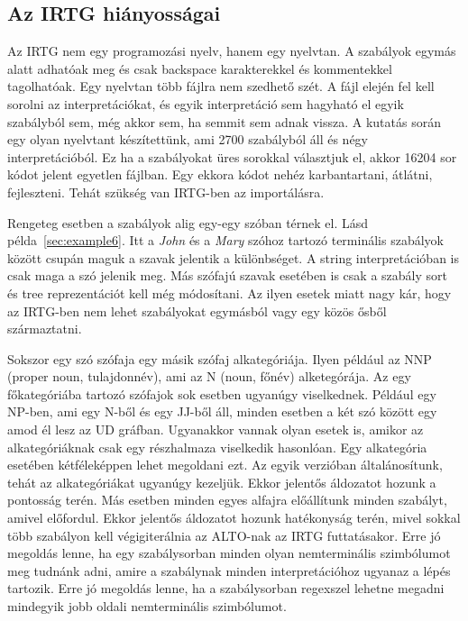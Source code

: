 \subsection{Az IRTG hiányosságai}
\label{sec:IRTGshortcomming}

Az IRTG nem egy programozási nyelv, hanem egy nyelvtan. A szabályok egymás alatt adhatóak meg és csak backspace karakterekkel és kommentekkel tagolhatóak. Egy nyelvtan több fájlra nem szedhető szét. A fájl elején fel kell sorolni az interpretációkat, és egyik interpretáció sem hagyható el egyik szabályból sem, még akkor sem, ha semmit sem adnak vissza. A kutatás során egy olyan nyelvtant készítettünk, ami 2700 szabályból áll és négy interpretációból. Ez ha a szabályokat üres sorokkal választjuk el, akkor 16204 sor kódot jelent egyetlen fájlban. Egy ekkora kódot nehéz karbantartani, átlátni, fejleszteni. Tehát szükség van IRTG-ben az importálásra.


Rengeteg esetben a szabályok alig egy-egy szóban térnek el. Lásd példa~\ref{sec:example6}.
Itt a \textit{John} és a \textit{Mary} szóhoz tartozó terminális szabályok között csupán maguk a szavak jelentik a különbséget. A string interpretációban is csak maga a szó jelenik meg. Más szófajú szavak esetében is csak a szabály sort és tree reprezentációt kell még módosítani. Az ilyen esetek miatt nagy kár, hogy az IRTG-ben nem lehet szabályokat egymásból vagy egy közös ősből származtatni.


Sokszor egy szó szófaja egy másik szófaj alkategóriája. Ilyen például az NNP (proper noun, tulajdonnév), ami az N (noun, főnév) alketegórája. Az egy főkategóriába tartozó szófajok sok esetben ugyanúgy viselkednek. Például egy NP-ben, ami egy N-ből és egy JJ-ből áll, minden esetben a két szó között egy amod él lesz az UD gráfban. Ugyanakkor vannak olyan esetek is, amikor az alkategóriáknak csak egy részhalmaza viselkedik hasonlóan. Egy alkategória esetében kétféleképpen lehet megoldani ezt. Az egyik verzióban általánosítunk, tehát az alkategóriákat ugyanúgy kezeljük. Ekkor jelentős áldozatot hozunk a pontosság terén. Más esetben minden egyes alfajra előállítunk minden szabályt, amivel előfordul. Ekkor jelentős áldozatot hozunk hatékonyság terén, mivel sokkal több szabályon kell végigiterálnia az ALTO-nak az IRTG futtatásakor. Erre jó megoldás lenne, ha egy szabálysorban minden olyan nemterminális szimbólumot meg tudnánk adni, amire a szabálynak minden interpretációhoz ugyanaz a lépés tartozik. Erre jó megoldás lenne, ha a szabálysorban regexszel lehetne megadni mindegyik jobb oldali nemterminális szimbólumot.


